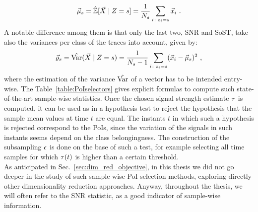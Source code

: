 \begin{equation}\label{eq:mmmXclass}
\mmmXclass= \esperEst[\given{\vaLeakVec}{\sensRandVar = \sensVarGenValue}] = \frac{1}{\nbTracesPerClass}\sum_{i\colon \sensVar_i=\sensVarGenValue} \vLeakVec_i  \mbox{ .}
\end{equation} 
A notable difference among them is that only the last two, SNR and SoST, take also the variances per class of the traces into account, given by:
\begin{equation}
\varXclass = \varEst(\given{\vaLeakVec}{\sensRandVar = \sensVarGenValue}) = \frac{1}{\nbTracesPerClass-1}\sum_{i\colon \sensVar_i=\sensVarGenValue} (\vLeakVec_i - \mmmXclass)^2 \mbox{ ,}
\end{equation}
where the estimation of the variance $\hat{\mathrm{Var}}$ of a vector has to be intended entry-wise.
The Table~\ref{table:PoIselectors} gives explicit formulas to compute such state-of-the-art sample-wise statistics. Once the chosen signal strength estimate $\tau$ is computed, it can be used as in a hypothesis test to reject the hypothesis that the sample mean values at time $t$ are equal. The instants $t$ in which such a hypothesis is rejected correspond to the PoIs, since the variation of the signals in such instants seems depend on the class belongingness. The construction of the subsampling $\epsilon$ is done on the base of such a test, for example selecting all time samples for which $\tau(t)$ is higher than a certain threshold. \\

As anticipated in Sec.~\ref{sec:dim_red_objective}, in this thesis we did not go deeper in the study of such sample-wise PoI selection methods, exploring directly other dimensionality reduction approaches. Anyway, throughout the thesis, we will often refer to the SNR statistic, as a good indicator of sample-wise information.

